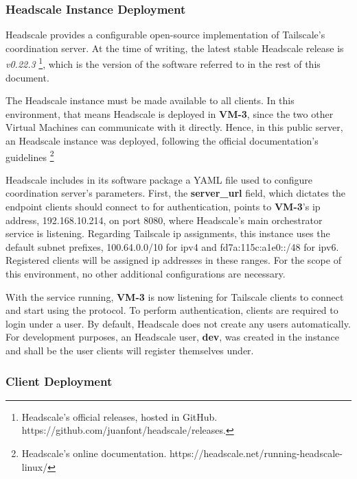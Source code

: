 \documentclass[11pt,twoside,a4paper]{report}
\begin{document}
\subsubsection{Headscale Instance Deployment}
\label{sec:devhs}

Headscale provides a configurable open-source implementation of Tailscale's coordination server. At the time of writing, the latest stable Headscale release is \emph{v0.22.3} \footnote{Headscale's official releases, hosted in GitHub. https://github.com/juanfont/headscale/releases.}, which is the version of the software referred to in the rest of this document.

The Headscale instance must be made available to all clients. In this environment, that means Headscale is deployed in \textbf{VM-3}, since the two other Virtual Machines can communicate with it directly. Hence, in this public server, an Headscale instance was deployed, following the official documentation's guidelines \footnote{Headscale's online documentation. https://headscale.net/running-headscale-linux/ }

Headscale includes in its software package a YAML file used to configure coordination server's parameters. First, the \textbf{server\_url} field, which dictates the endpoint clients should connect to for authentication, points to \textbf{VM-3}'s \ac{ip} address, 192.168.10.214, on port 8080, where Headscale's main orchestrator service is listening. Regarding Tailscale \ac{ip} assignments, this instance uses the default subnet prefixes, 100.64.0.0/10 for ipv4 and fd7a:115c:a1e0::/48 for ipv6. Registered clients will be assigned \ac{ip} addresses in these ranges. For the scope of this environment, no other additional configurations are necessary.

With the service running, \textbf{VM-3} is now listening for Tailscale clients to connect and start using the protocol. To perform authentication, clients are required to login under a user. By default, Headscale does not create any users automatically. For development purposes, an Headscale user, \textbf{dev}, was created in the instance and shall be the user clients will register themselves under.

\subsubsection{Client Deployment}
\end{document}
